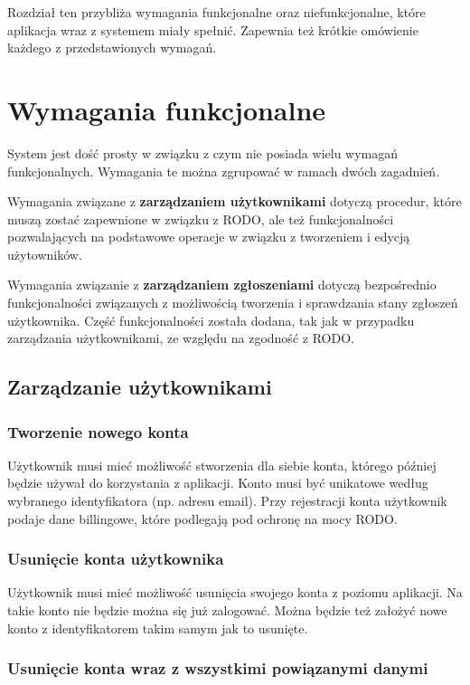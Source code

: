 Rozdział ten przybliża wymagania funkcjonalne oraz niefunkcjonalne, które aplikacja wraz z systemem miały spełnić.
Zapewnia też krótkie omówienie każdego z przedstawionych wymagań.

\section{Wymagania funkcjonalne}

System jest dość prosty w związku z czym nie posiada wielu wymagań funkcjonalnych.
Wymagania te można zgrupować w ramach dwóch zagadnień. 

Wymagania związane z \textbf{zarządzaniem użytkownikami} dotyczą procedur, które 
muszą zostać zapewnione w związku z RODO, ale też funkcjonalności pozwalających na
podstawowe operacje w związku z tworzeniem i edycją użytowników.

Wymagania związanie z \textbf{zarządzaniem zgłoszeniami} dotyczą bezpośrednio funkcjonalności 
związanych z możliwością tworzenia i sprawdzania stany zgłoszeń użytkownika.
Część funkcjonalności została dodana, tak jak w przypadku zarządzania użytkownikami, ze względu
na zgodność z RODO.

\subsection{Zarządzanie użytkownikami}
\label{sec:user_func}

\subsubsection{Tworzenie nowego konta}

Użytkownik musi mieć możliwość stworzenia dla siebie konta, którego później będzie używał do
korzystania z aplikacji. Konto musi być unikatowe według wybranego identyfikatora (np. adresu email).
Przy rejestracji konta użytkownik podaje dane billingowe, które podlegają pod ochronę na mocy RODO. 

\subsubsection{Usunięcie konta użytkownika}

Użytkownik musi mieć możliwość usunięcia swojego konta z poziomu aplikacji.
Na takie konto nie będzie można się już zalogować. 
Można będzie też założyć nowe konto z identyfikatorem takim samym jak to usunięte. 

\subsubsection{Usunięcie konta wraz z wszystkimi powiązanymi danymi}

